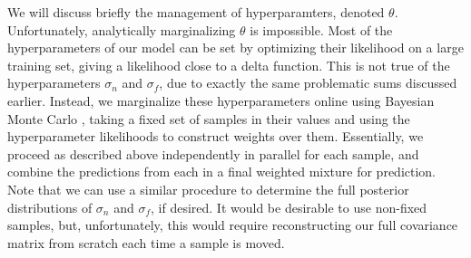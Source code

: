 \documentclass{article}
\newcommand{\cm}[1]{\ensuremath{\mathcal{#1}}}
\newcommand{\data}{\ensuremath{\cm{D}}}
\begin{document}


We will discuss briefly the management of hyperparamters, denoted
$\theta$. Unfortunately, analytically marginalizing $\theta$ is
impossible. Most of the hyperparameters of our model can be set by
optimizing their likelihood on a large training set, giving a
likelihood close to a delta function. This is not true of the
hyperparameters $\sigma_n$ and $\sigma_f$, due to exactly the same
problematic sums discussed earlier. Instead, we marginalize these
hyperparameters online using Bayesian Monte Carlo \citep[Chapter
  7]{osbornebayesian}, taking a fixed set of samples in their values
and using the hyperparameter likelihoods to construct weights over
them. Essentially, we proceed as described above independently in
parallel for each sample, and combine the predictions from each in a
final weighted mixture for prediction. Note that we can use a similar
procedure \citep{garnettosborne} to determine the full posterior
distributions of $\sigma_n$ and $\sigma_f$, if desired.  It would be
desirable to use non-fixed samples, but, unfortunately, this would
require reconstructing our full covariance matrix from scratch each
time a sample is moved.



\end{document}
